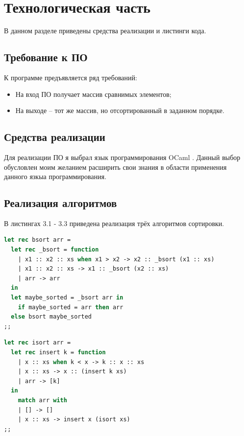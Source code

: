 \documentclass[12pt]{report}
\begin{document}
\chapter{Технологическая часть}

В данном разделе приведены средства реализации и листинги кода.

\section{Требование к ПО}

К программе предъявляется ряд требований:

\begin{itemize}
	\item На вход ПО получает массив сравнимых элементов;
	\item На выходе -- тот же массив, но отсортированный в заданном порядке.
\end{itemize}

\section{Средства реализации}
Для реализации ПО я выбрал язык программирования OCaml \cite{Ocaml}. Данный выбор обусловлен моим желанием расширить свои знания в области применения данного язкыа программирования. 

\section{Реализация алгоритмов}

В листингах 3.1 - 3.3 приведена реализация трёх алгоритмов сортировки.

\begin{lstlisting}[label=some-code,caption=Функция сортировки массива пузырьком, language=Caml]
let rec bsort arr =
  let rec _bsort = function
    | x1 :: x2 :: xs when x1 > x2 -> x2 :: _bsort (x1 :: xs)
    | x1 :: x2 :: xs -> x1 :: _bsort (x2 :: xs)
    | arr -> arr
  in
  let maybe_sorted = _bsort arr in
    if maybe_sorted = arr then arr
  else bsort maybe_sorted
;;
\end{lstlisting}

\begin{lstlisting}[label=some-code,caption=Функция сортировки массива вставками,language=Caml]
let rec isort arr =
  let rec insert k = function
    | x :: xs when k < x -> k :: x :: xs
    | x :: xs -> x :: (insert k xs)
    | arr -> [k]
  in
    match arr with
    | [] -> []
    | x :: xs -> insert x (isort xs)
;;
\end{lstlisting}
\end{document}

